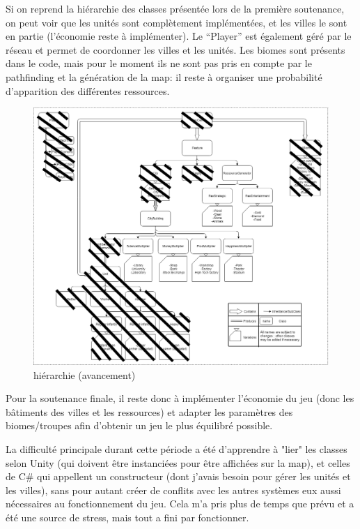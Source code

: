 \documentclass[12pt]{report}
\begin{document}
Si on reprend la hiérarchie des classes présentée lors de la première soutenance, on peut voir que les unités sont complètement implémentées, et les villes le sont en partie (l’économie reste à implémenter). Le “Player” est également géré par le réseau et permet de coordonner les villes et les unités. Les biomes sont présents dans le code, mais pour le moment ils ne sont pas pris en compte par le pathfinding et la génération de la map: il reste à organiser une probabilité d’apparition des différentes ressources.

\begin{figure}[H]
    \centering
    \includegraphics[width=1\textwidth]{class_hierarchy}
    \caption{hiérarchie (avancement)}
\end{figure}

Pour la soutenance finale, il reste donc à implémenter l’économie du jeu (donc les bâtiments des villes et les ressources) et adapter les paramètres des biomes/troupes afin d’obtenir un jeu le plus équilibré possible.

La difficulté principale durant cette période a été d'apprendre à "lier" les classes selon Unity (qui doivent être instanciées pour être affichées sur la map), et celles de C\# qui appellent un constructeur (dont j'avais besoin pour gérer les unités et les villes), sans pour autant créer de conflits avec les autres systèmes eux aussi nécessaires au fonctionnement du jeu. Cela m'a pris plus de temps que prévu et a été une source de stress, mais tout a fini par fonctionner.
\end{document}
